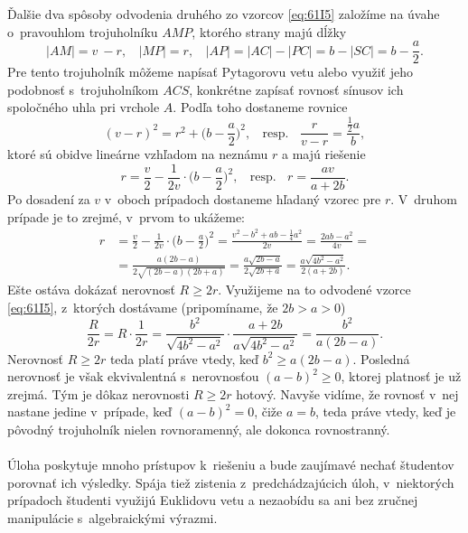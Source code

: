 {Ďalšie dva spôsoby odvodenia druhého zo vzorcov \ref{eq:61I5} založíme na úvahe o~pravouhlom trojuholníku $AMP$, ktorého strany majú dĺžky
$$|AM| = v~-r, \ \ \ \ |MP| = r, \ \ \ \ |AP| = |AC| - |PC| = b - |SC| = b - \frac{a}{2}.$$
Pre tento trojuholník môžeme napísať Pytagorovu vetu alebo využiť jeho podobnosť s~trojuholníkom $ACS$, konkrétne zapísať rovnosť sínusov ich spoločného uhla pri vrchole $A$. Podľa toho dostaneme rovnice
$$(v - r)^2= r^2+\big(b -\frac{a}{2}\big)^2, \ \ \ \ \text{resp.} \ \ \ \ \frac{r}{v-r}=  \frac{\frac{1}{2}a}{b},$$
ktoré sú obidve lineárne vzhľadom na neznámu $r$ a majú riešenie
$$r = \frac{v}{2}-\frac{1}{2v}\cdot \big( b - \frac{a}{2} \big)^2, \ \ \ \ \text{resp.}\ \ \ \  r=\frac{av}{a+2b}.$$
Po dosadení za $v$ v~oboch prípadoch dostaneme hľadaný vzorec pre $r$. V~druhom prípade
je to zrejmé, v~prvom to ukážeme:
\begin{align*}
r & =\frac{v}{2}  - \frac{1}{2v} \cdot \bigg(b -\frac{a}{2}\bigg)^2= \frac{v^2 - b^2 + ab- \frac{1}{4}a^2}{2v}=\frac{2ab - a^2}{4v}=\\
& = \frac{a(2b - a)}{2\sqrt{(2b -a)(2b + a)}}=\frac{a\sqrt{2b-a}}{2\sqrt{2b+a}} =\frac{a \sqrt{4b^2 -a^2}}{2(a + 2b)}.
\end{align*}
Ešte ostáva dokázať nerovnosť $R \geq 2r$. Využijeme na to odvodené vzorce \ref{eq:61I5}, z~ktorých dostávame (pripomíname, že $2b > a > 0$)
$$ \frac{R}{2r}= R \cdot \frac{1}{2r}=\frac{b^2}{\sqrt{4b^2-a^2}}\cdot \frac{a+2b}{a \sqrt{4b^2-a^2}}=\frac{b^2}{a(2b-a)}.$$
Nerovnosť $R \geq 2r$ teda platí práve vtedy, keď $b^2\geq a(2b -a)$. Posledná nerovnosť je však ekvivalentná s~nerovnosťou $(a - b)^2\geq 0$, ktorej platnosť je už zrejmá. Tým je dôkaz nerovnosti $R \geq 2r$ hotový. Navyše vidíme, že rovnosť v~nej nastane jedine v~prípade, keď $(a - b)^2 = 0$, čiže $a = b$, teda práve vtedy, keď je pôvodný trojuholník nielen rovnoramenný, ale dokonca rovnostranný.\\
\\
\kom Úloha poskytuje mnoho prístupov k~riešeniu a bude zaujímavé nechať študentov porovnať ich výsledky. Spája tiež zistenia z~predchádzajúcich úloh, v~niektorých prípadoch študenti využijú Euklidovu vetu a nezaobídu sa ani bez zručnej manipulácie s~algebraickými výrazmi. \\
\\
}
